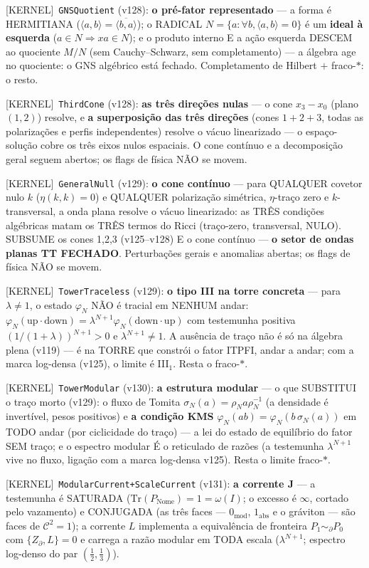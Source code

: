 \documentclass[11pt]{article}
\providecommand{\kernelmk}[1]{\textsf{[KERNEL]}~\texttt{#1}}\providecommand{\knownmk}[1]{\textsf{[KNOWN]}~{#1}}\providecommand{\statusmk}[1]{\textsf{[#1]}}
\theoremstyle{definition}\newtheorem{deriv}{Derivação}
\begin{document}
\kernelmk{GNSQuotient} (v128): \textbf{o pré-fator representado} --- a forma é HERMITIANA ($\langle a,b\rangle=\overline{\langle b,a\rangle}$); o RADICAL $N=\{a:\forall b,\langle a,b\rangle=0\}$ é um \textbf{ideal à esquerda} ($a\in N\Rightarrow x a\in N$); e o produto interno E a ação esquerda DESCEM ao quociente $M/N$ (sem Cauchy--Schwarz, sem completamento) --- a álgebra age no quociente: o GNS algébrico está fechado. Completamento de Hilbert $+$ fraco-$*$: o resto.

\kernelmk{ThirdCone} (v128): \textbf{as três direções nulas} --- o cone $x_3{-}x_0$ (plano $(1,2)$) resolve, e \textbf{a superposição das três direções} (cones $1{+}2{+}3$, todas as polarizações e perfis independentes) resolve o vácuo linearizado --- o espaço-solução cobre os três eixos nulos espaciais. O cone contínuo e a decomposição geral seguem abertos; os flags de física NÃO se movem.

\kernelmk{GeneralNull} (v129): \textbf{o cone contínuo} --- para QUALQUER covetor nulo $k$ ($\eta(k,k)=0$) e QUALQUER polarização simétrica, $\eta$-traço zero e $k$-transversal, a onda plana resolve o vácuo linearizado: as TRÊS condições algébricas matam os TRÊS termos do Ricci (traço-zero, transversal, NULO). SUBSUME os cones 1,2,3 (v125--v128) E o cone contínuo --- \textbf{o setor de ondas planas TT FECHADO}. Perturbações gerais e anomalias abertas; os flags de física NÃO se movem.

\kernelmk{TowerTraceless} (v129): \textbf{o tipo III na torre concreta} --- para $\lambda\neq1$, o estado $\varphi_N$ NÃO é tracial em NENHUM andar: $\varphi_N(\text{up}\cdot\text{down})=\lambda^{N+1}\varphi_N(\text{down}\cdot\text{up})$ com testemunha positiva $(1/(1{+}\lambda))^{N+1}>0$ e $\lambda^{N+1}\neq1$. A ausência de traço não é só na álgebra plena (v119) --- é na TORRE que constrói o fator ITPFI, andar a andar; com a marca log-densa (v125), o limite é III$_1$. Resta o fraco-$*$.

\kernelmk{TowerModular} (v130): \textbf{a estrutura modular} --- o que SUBSTITUI o traço morto (v129): o fluxo de Tomita $\sigma_N(a)=\rho_N a\rho_N^{-1}$ (a densidade é invertível, pesos positivos) e \textbf{a condição KMS} $\varphi_N(ab)=\varphi_N(b\,\sigma_N(a))$ em TODO andar (por ciclicidade do traço) --- a lei do estado de equilíbrio do fator SEM traço; e o espectro modular É o reticulado de razões (a testemunha $\lambda^{N+1}$ vive no fluxo, ligação com a marca log-densa v125). Resta o limite fraco-$*$.

\kernelmk{ModularCurrent+\allowbreak ScaleCurrent} (v131): \textbf{a corrente J} --- a testemunha é SATURADA ($\mathrm{Tr}(P_{\mathrm{Nome}})=1=\omega(I)$; o excesso é $\infty$, cortado pelo vazamento) e CONJUGADA (as três faces --- $0_{\mathrm{mod}}$, $1_{\mathrm{abs}}$ e o gráviton --- são faces de $\mathcal{C}^2=1$); a corrente $L$ implementa a equivalência de fronteira $P_1\sim_\partial P_0$ com $\{Z_\partial,L\}=0$ e carrega a razão modular em TODA escala ($\lambda^{N+1}$; espectro log-denso do par $(\tfrac12,\tfrac13)$).
\end{document}
